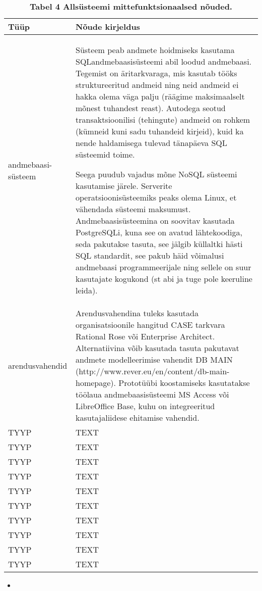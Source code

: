 \begin{table}[H]
	\caption{\textbf{Tabel 4 Allsüsteemi mittefunktsionaalsed nõuded.}}
	\begin{tabu} to \textwidth {| X[0.2] | X |}
		\hline 
		
		\textbf{Tüüp}          
		&  \textbf{Nõude kirjeldus} \\ \hline
		
		andmebaasi- süsteem 
		& Süsteem peab andmete hoidmiseks kasutama SQLandmebaasisüsteemi abil loodud andmebaasi. Tegemist on äritarkvaraga, mis kasutab tööks struktureeritud andmeid ning neid andmeid ei hakka olema väga palju (räägime maksimaalselt mõnest tuhandest reast). Autodega seotud transaktsioonilisi (tehingute) andmeid on rohkem (kümneid kuni sadu tuhandeid kirjeid), kuid ka nende haldamisega tulevad tänapäeva SQL süsteemid toime.
		\linebreak \par  Seega puudub vajadus mõne NoSQL süsteemi kasutamise järele. Serverite operatsioonisüsteemiks peaks olema Linux, et vähendada süsteemi maksumust. Andmebaasisüsteemina on soovitav kasutada PostgreSQLi, kuna see on avatud lähtekoodiga, seda pakutakse tasuta, see jälgib küllaltki hästi SQL standardit, see pakub häid võimalusi andmebaasi programmeerijale ning sellele on suur kasutajate kogukond (st abi ja tuge pole keeruline leida). \\ \hline
		
		arendusvahendid 
		& Arendusvahendina tuleks kasutada organisatsioonile hangitud CASE tarkvara Rational Rose või Enterprise Architect. Alternatiivina võib kasutada tasuta pakutavat andmete modelleerimise vahendit DB MAIN 
		(http://www.rever.eu/en/content/db-main-homepage). Prototüübi koostamiseks kasutatakse töölaua andmebaasisüsteemi MS Access või LibreOffice Base, kuhu on integreeritud kasutajaliidese ehitamise vahendid.  \\ \hline
		
		TYYP 
		& TEXT  \\ \hline
		
		TYYP 
		& TEXT  \\ \hline
		
		TYYP 
		& TEXT  \\ \hline
		
		TYYP 
		& TEXT  \\ \hline
		
		TYYP 
		& TEXT  \\ \hline
		
		TYYP 
		& TEXT  \\ \hline
		
		TYYP 
		& TEXT  \\ \hline
		
		TYYP 
		& TEXT  \\ \hline
		
		TYYP 
		& TEXT  \\ \hline
		
		TYYP 
		& TEXT  \\ \hline
		
	\end{tabu}
\end{table}

\begin{itemize}
	\item 
\end{itemize}